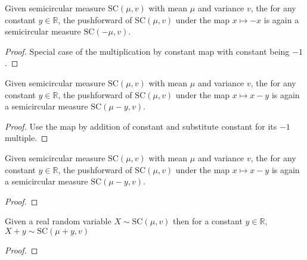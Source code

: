 \begin{lemma}\label{lem:semicircleReal_map_neg}
  \mathlibok
  Given semicircular measure $\mathrm{SC}(\mu, v)$ with mean $\mu$ and variance $v$, the for any constant $y \in \mathbb{R}$, the pushforward
  of $\mathrm{SC}(\mu, v)$ under the map $x \mapsto -x$ is again a semicircular measure $\mathrm{SC}(- \mu, v)$. 
  \begin{proof}
     Special case of the multiplication by constant map with constant being $-1$.
  \end{proof}
\end{lemma}

\begin{lemma}\label{lem:semicircleReal_map_sub_const}
  \mathlibok
  Given semicircular measure $\mathrm{SC}(\mu, v)$ with mean $\mu$ and variance $v$, the for any constant $y \in \mathbb{R}$, the pushforward
  of $\mathrm{SC}(\mu, v)$ under the map $x \mapsto x - y$ is again a semicircular measure $\mathrm{SC}( \mu - y, v)$. 
  \begin{proof}
   Use the map by addition of constant and substitute constant for its $-1$ multiple.
  \end{proof}
\end{lemma}


\begin{lemma}\label{lem:semicircleReal_map_const_sub}
  \mathlibok
   Given semicircular measure $\mathrm{SC}(\mu, v)$ with mean $\mu$ and variance $v$, the for any constant $y \in \mathbb{R}$, the pushforward
  of $\mathrm{SC}(\mu, v)$ under the map $x \mapsto x - y$ is again a semicircular measure $\mathrm{SC}(\mu - y, v)$. 
  \begin{proof}

  \end{proof}
\end{lemma}



\begin{lemma}\label{lem:semicircleReal_add_const}
  \mathlibok
  Given a real random variable $X \sim \mathrm{SC}(\mu, v)$
  then for a constant $y \in \mathbb{R}$, $X + y \sim \mathrm{SC}(\mu + y, v)$
  \begin{proof}
  \end{proof}
\end{lemma}


